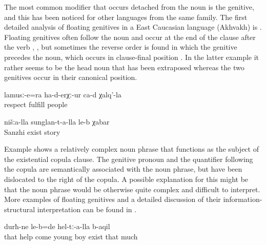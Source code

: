 The most common modifier that occurs detached from the noun is the genitive, and this has been noticed for other languages from the same family. The first detailed analysis of floating genitives in a East Caucasian language (Akhvakh) is \citet{Creissels2013}. Floating genitives often follow the noun and occur at the end of the clause after the verb , , but sometimes the reverse order is found in which the genitive precedes the noun, which occurs in clause-final position . In the latter example it rather seems to be the head noun that has been extraposed whereas the two genitives occur in their canonical position. 

%
\begin{exe}
	\ex	\label{ex:The people's respect also finished}
	\gll	lamusː-e=ra	ha-d-erχː-ur	ca-d	χalq'-la\\
		respect	fulfill		people\\
	\glt	{}

	\ex	\label{ex:‎We Sanzhi people have a story}
	\gll	nišːa-lla	sunglan-t-a-lla	le-b	χabar\\
			Sanzhi	exist	story\\
	\glt	{}
\end{exe}


Example  shows a relatively complex noun phrase that functions as the subject of the existential copula clause. The genitive pronoun and the quantifier following the copula are semantically associated with the noun phrase, but have been dislocated to the right of the copula. A possible explanation for this might be that the noun phrase would be otherwise quite complex and difficult to interpret. More examples of floating genitives and a detailed discussion of their information-structural interpretation can be found in . 
%
\begin{exe}
	\ex	\label{ex:‎They had many young boys who had come to help}
		durħ-ne	le-b=de hel-tː-a-lla	b-aqil\\
		that	help	come	young	boy	exist	that	much\\
	\glt	{}
\end{exe}

